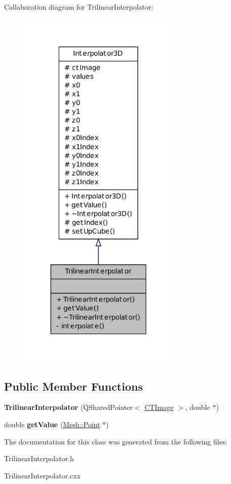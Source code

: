 Collaboration diagram for TrilinearInterpolator:
\nopagebreak
\begin{figure}[H]
\begin{center}
\leavevmode
\includegraphics[width=220pt]{class_trilinear_interpolator__coll__graph}
\end{center}
\end{figure}
\subsection*{Public Member Functions}
\begin{DoxyCompactItemize}
\item 
\hypertarget{class_trilinear_interpolator_afa5e107b7b63f785fc74a436f3f0954a}{
{\bfseries TrilinearInterpolator} (QSharedPointer$<$ \hyperlink{class_c_t_image}{CTImage} $>$, double $\ast$)}
\label{class_trilinear_interpolator_afa5e107b7b63f785fc74a436f3f0954a}

\item 
\hypertarget{class_trilinear_interpolator_a5aea6fa35c906e4e10f7d9c8183df6ad}{
double {\bfseries getValue} (\hyperlink{struct_mesh_1_1_point}{Mesh::Point} $\ast$)}
\label{class_trilinear_interpolator_a5aea6fa35c906e4e10f7d9c8183df6ad}

\end{DoxyCompactItemize}


The documentation for this class was generated from the following files:\begin{DoxyCompactItemize}
\item 
TrilinearInterpolator.h\item 
TrilinearInterpolator.cxx\end{DoxyCompactItemize}
